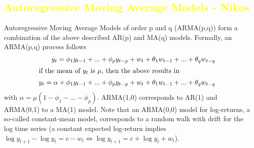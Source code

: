 \subsection{\textcolor{yellow}{Autoregressive Moving Average Models - Nikos}}
Autoregressive Moving Average Models of order p and q (ARMA(p,q)) form a combination of the above described AR(p) and MA(q) models. Formally, an ARMA(p,q) process follows
\begin{align}
    y_t = \phi_1 y_{t-1} + ... + \phi_p y_{t-p} + w_t + \theta_1 w_{t-1} + ... + \theta_q w_{t-q} \\
    \intertext{if the mean of $y_t$ is $\mu$, then the above results in}
    y_t = \alpha + \phi_1 y_{t-1} + ... + \phi_p y_{t-p} + w_t + \theta_1 w_{t-1} + ... + \theta_q w_{t-q}
\end{align}
with $\alpha = \mu (1 - \phi_1 - ... - \phi_p)$. ARMA(1,0) corresponds to AR(1) and ARMA(0,1) to a MA(1) model. Note that an ARMA(0,0) model for log-returns, a so-called constant-mean model, corresponds to a random walk with drift for the log time series (a constant expected log-return implies $\log{y_{t+1}} - \log{y_t} = c - w_t \Leftrightarrow \log{y_{t+1}} = c + \log{y_t} + w_t$). 


